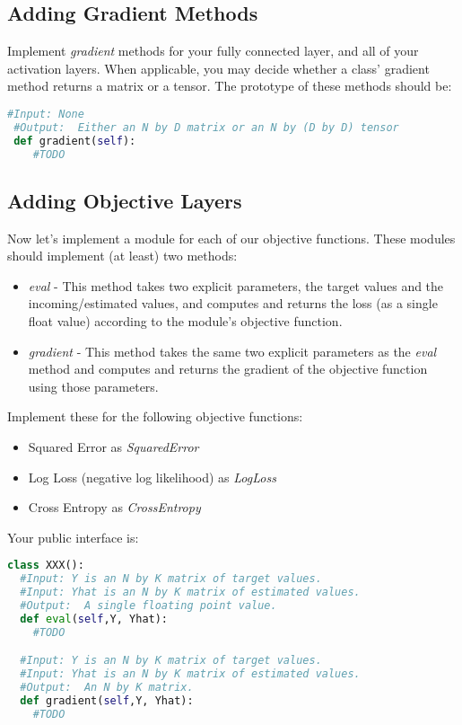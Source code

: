 \documentclass[12pt]{article}
\begin{document}
\subsection*{Adding Gradient Methods}
Implement \emph{gradient} methods for your fully connected layer, and all of your activation layers.  When applicable, you may decide whether a class' gradient method returns a matrix or a tensor.  The prototype of these methods should be:\\

\begin{lstlisting}[language=Python]
 #Input: None
 #Output:  Either an N by D matrix or an N by (D by D) tensor
 def gradient(self):
    #TODO
\end{lstlisting}


\subsection*{Adding Objective Layers}
Now let's implement a module for each of our objective functions.  These modules should implement (at least) two methods:
\begin{itemize}
\item \emph{eval} - This method takes two explicit parameters, the target values and the incoming/estimated values,  and computes and returns the loss (as a single float value) according to the module's objective function.
\item \emph{gradient} - This method takes the same two explicit parameters as the \emph{eval} method and computes and returns the gradient of the objective function using those parameters.
\end{itemize}

\noindent
Implement these for the following objective functions:
\begin{itemize}
\item Squared Error as \emph{SquaredError}
\item Log Loss (negative log likelihood)  as \emph{LogLoss}
\item Cross Entropy as \emph{CrossEntropy}
\end{itemize}

\noindent
Your public interface is:

\begin{lstlisting}[language=Python]
class XXX():
  #Input: Y is an N by K matrix of target values.
  #Input: Yhat is an N by K matrix of estimated values.
  #Output:  A single floating point value.
  def eval(self,Y, Yhat):
    #TODO

  #Input: Y is an N by K matrix of target values.
  #Input: Yhat is an N by K matrix of estimated values.
  #Output:  An N by K matrix.
  def gradient(self,Y, Yhat):
    #TODO
\end{lstlisting}
\end{document}
